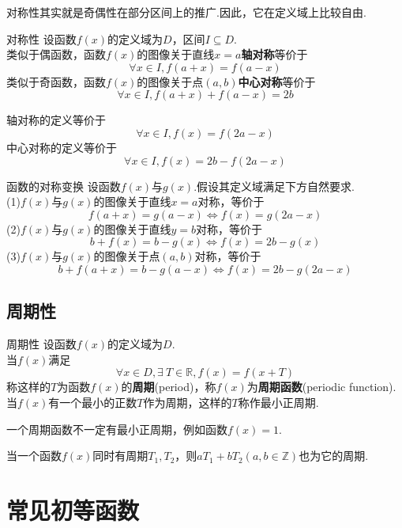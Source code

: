 \documentclass[lang=cn, zihao=5]{elegantbook}
\begin{document}
对称性其实就是奇偶性在部分区间上的推广.因此，它在定义域上比较自由.

\begin{definition}{对称性} %
    设函数$f(x)$的定义域为$D$，区间$I \subseteq D$.\\
    类似于偶函数，函数$f(x)$的图像关于直线$x=a$\textbf{轴对称}等价于
    $$ \forall x \in I, f(a+x)=f(a-x) $$
    类似于奇函数，函数$f(x)$的图像关于点$(a,b)$\textbf{中心对称}等价于
    $$ \forall x \in I, f(a+x)+f(a-x)=2b $$
\end{definition}
\begin{remark}
    轴对称的定义等价于$$\forall x \in I, f(x)=f(2a-x)$$
    中心对称的定义等价于$$\forall x \in I, f(x)=2b-f(2a-x)$$
\end{remark}

\begin{proposition}{函数的对称变换}
    设函数$f(x)$与$g(x)$.假设其定义域满足下方自然要求.\\
    (1)$f(x)$与$g(x)$的图像关于直线$x=a$对称，等价于$$f(a+x)=g(a-x) \Longleftrightarrow f(x)=g(2a-x)$$
    (2)$f(x)$与$g(x)$的图像关于直线$y=b$对称，等价于$$b+f(x)=b-g(x) \Longleftrightarrow f(x)=2b-g(x)$$
    (3)$f(x)$与$g(x)$的图像关于点$(a,b)$对称，等价于$$b+f(a+x)=b-g(a-x) \Longleftrightarrow f(x)=2b-g(2a-x)$$
\end{proposition}

\subsection{周期性}

\begin{definition}{周期性} %
    设函数$f(x)$的定义域为$D$.\\
    当$f(x)$满足$$\forall x \in D, \exists \ T \in \mathbb{R}, f(x)=f(x+T)$$
    称这样的$T$为函数$f(x)$的\textbf{周期}(period)，称$f(x)$为\textbf{周期函数}(periodic function).当$f(x)$有一个最小的正数$T$作为周期，这样的$T$称作最小正周期.
\end{definition}

\begin{remark}
    一个周期函数不一定有最小正周期，例如函数$f(x)=1$.
\end{remark}
\begin{remark}
    当一个函数$f(x)$同时有周期$T_1,T_2$，则$aT_1+bT_2(a,b \in \mathbb{Z})$也为它的周期.
\end{remark}

\section{常见初等函数}
\end{document}
